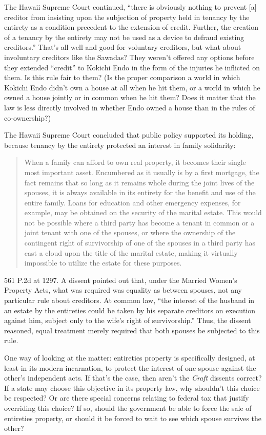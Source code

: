 The Hawaii Supreme Court continued, ``there is obviously nothing to prevent [a]
creditor from insisting upon the subjection of property held in tenancy by the
entirety as a condition precedent to the extension of credit. Further, the
creation of a tenancy by the entirety may not be used as a device to defraud
existing creditors.'' That's all well and good for voluntary creditors, but
what about involuntary creditors like the Sawadas? They weren't offered any
options before they extended ``credit'' to Kokichi Endo in the form of the
injuries he inflicted on them. Is this rule fair to them? (Is the proper
comparison a world in which Kokichi Endo didn't own a house at all when he hit
them, or a world in which he owned a house jointly or in common when he hit
them? Does it matter that the law is less directly involved in whether Endo
owned a house than in the rules of co-ownership?)


The Hawaii Supreme Court concluded that public policy supported its holding,
because tenancy by the entirety protected an interest in family solidarity:
\begin{quote}
When a family can afford to own real property, it becomes their single most
important asset. Encumbered as it usually is by a first mortgage, the fact
remains that so long as it remains whole during the joint lives of the spouses,
it is always available in its entirety for the benefit and use of the entire
family. Loans for education and other emergency expenses, for example, may be
obtained on the security of the marital estate. This would not be possible
where a third party has become a tenant in common or a joint tenant with one of
the spouses, or where the ownership of the contingent right of survivorship of
one of the spouses in a third party has cast a cloud upon the title of the
marital estate, making it virtually impossible to utilize the estate for these
purposes.
\end{quote}
561 P.2d at 1297. A dissent pointed out that, under the Married Women's Property
Acts, what was required was equality as between spouses, not any particular
rule about creditors. At common law, ``the interest of the husband in an
estate by the entireties could be taken by his separate creditors on execution
against him, subject only to the wife's right of survivorship.'' Thus, the
dissent reasoned, equal treatment merely required that both spouses be
subjected to this rule.



One way of looking at the matter: entireties property is specifically designed,
at least in its modern incarnation, to protect the interest of one spouse
against the other's independent acts. If that's the case, then aren't the
\textit{Craft} dissents correct? If a state may choose this objective in its
property law, why shouldn't this choice be respected? Or are there special
concerns relating to federal tax that justify overriding this choice? If so,
should the government be able to force the sale of entireties property, or
should it be forced to wait to see which spouse survives the other?



